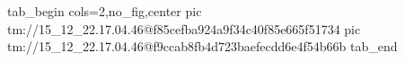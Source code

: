  
 
 
 
 

\qqSecOrig


\ifcmt
  tab_begin cols=2,no_fig,center
    pic tm://15_12_22.17.04.46@f85cefba924a9f34c40f85e665f51734
    pic tm://15_12_22.17.04.46@f9ccab8fb4d723baefecdd6e4f54b66b
  tab_end
\fi

